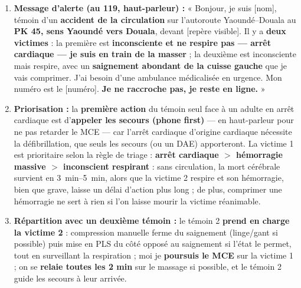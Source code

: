 \documentclass[11pt]{article}
\begin{document}
\begin{corrige}
\begin{enumerate}
    \item \textbf{Message d'alerte (au 119, haut-parleur) :} « Bonjour, je suis [nom], témoin d'un \textbf{accident de la circulation} sur l'autoroute Yaoundé--Douala au \textbf{PK 45, sens Yaoundé vers Douala}, devant [repère visible]. Il y a \textbf{deux victimes} : la première est \textbf{inconsciente et ne respire pas — arrêt cardiaque — je suis en train de la masser} ; la deuxième est inconsciente mais respire, avec un \textbf{saignement abondant de la cuisse gauche} que je vais comprimer. J'ai besoin d'une ambulance médicalisée en urgence. Mon numéro est le [numéro]. \textbf{Je ne raccroche pas, je reste en ligne.} »
    \item \textbf{Priorisation :} la \textbf{première action} du témoin seul face à un adulte en arrêt cardiaque est d'\textbf{appeler les secours (phone first)} — en haut-parleur pour ne pas retarder le MCE — car l'arrêt cardiaque d'origine cardiaque nécessite la défibrillation, que seuls les secours (ou un DAE) apporteront. La victime 1 est prioritaire selon la règle de triage : \textbf{arrêt cardiaque $>$ hémorragie massive $>$ inconscient respirant} : sans circulation, la mort cérébrale survient en \SIrange{3}{5}{min}, alors que la victime 2 respire et son hémorragie, bien que grave, laisse un délai d'action plus long ; de plus, comprimer une hémorragie ne sert à rien si l'on laisse mourir la victime réanimable.
    \item \textbf{Répartition avec un deuxième témoin :} le témoin 2 \textbf{prend en charge la victime 2} : compression manuelle ferme du saignement (linge/gant si possible) puis mise en PLS du côté opposé au saignement si l'état le permet, tout en surveillant la respiration ; moi je \textbf{poursuis le MCE} sur la victime 1 ; on se \textbf{relaie toutes les 2 min} sur le massage si possible, et le témoin 2 guide les secours à leur arrivée.
\end{enumerate}
\end{corrige}
\end{document}
